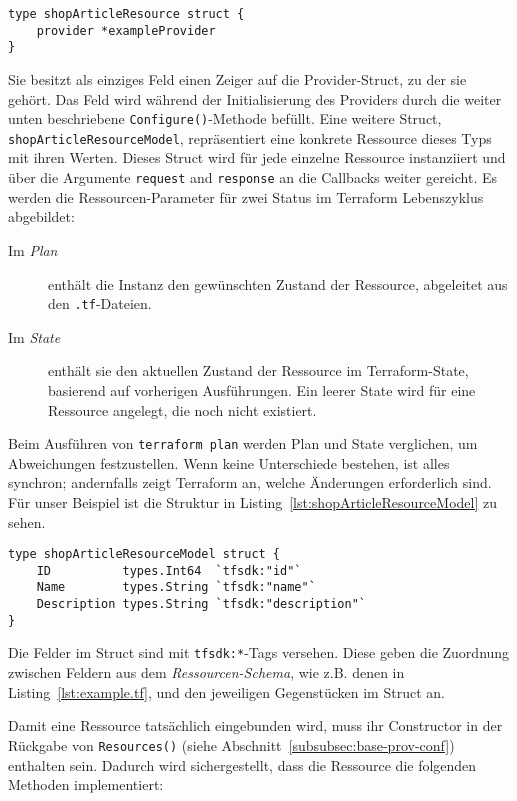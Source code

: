 \documentclass[paper=a4,11pt,numbers=noenddot]{article}
\begin{document}
\begin{lstlisting}[label=lst:shopArticleResource]
type shopArticleResource struct {
	provider *exampleProvider
}
\end{lstlisting}

Sie besitzt als einziges Feld einen Zeiger auf die Provider-Struct, zu der sie gehört. Das Feld wird während der Initialisierung des Providers durch die weiter unten beschriebene \verb'Configure()'-Methode befüllt. Eine weitere Struct, \verb'shopArticleResourceModel', repräsentiert eine konkrete Ressource dieses Typs mit ihren Werten. Dieses Struct wird für jede einzelne Ressource instanziiert und über die Argumente \verb'request' and \verb'response' an die Callbacks weiter gereicht. Es werden die Ressourcen-Parameter für zwei Status im Terraform Lebenszyklus abgebildet:

\begin{description}
\item[Im \emph{Plan}] enthält die Instanz den gewünschten Zustand der Ressource, abgeleitet aus den \verb'.tf'-Dateien.
\item[Im \emph{State}] enthält sie den aktuellen Zustand der Ressource im Terraform-State, basierend auf vorherigen Ausführungen. Ein leerer State wird für eine Ressource angelegt, die noch nicht existiert.
\end{description}

Beim Ausführen von \verb'terraform plan' werden Plan und State verglichen, um Abweichungen festzustellen. Wenn keine Unterschiede bestehen, ist alles synchron; andernfalls zeigt Terraform an, welche Änderungen erforderlich sind. Für unser Beispiel ist die Struktur in Listing~\ref{lst:shopArticleResourceModel} zu sehen.

\begin{lstlisting}[label=lst:shopArticleResourceModel]
type shopArticleResourceModel struct {
	ID          types.Int64  `tfsdk:"id"`
	Name        types.String `tfsdk:"name"`
	Description types.String `tfsdk:"description"`
}
\end{lstlisting}

Die Felder im Struct sind mit \verb'tfsdk:*'-Tags versehen. Diese geben die Zuordnung zwischen Feldern aus dem \emph{Ressourcen-Schema}, wie z.B. denen in Listing~\ref{lst:example.tf}, und den jeweiligen Gegenstücken im Struct an.

Damit eine Ressource tatsächlich eingebunden wird, muss ihr Constructor in der Rückgabe von \verb'Resources()' (siehe Abschnitt~\ref{subsubsec:base-prov-conf}) enthalten sein. Dadurch wird sichergestellt, dass die Ressource die folgenden Methoden implementiert:
\end{document}
